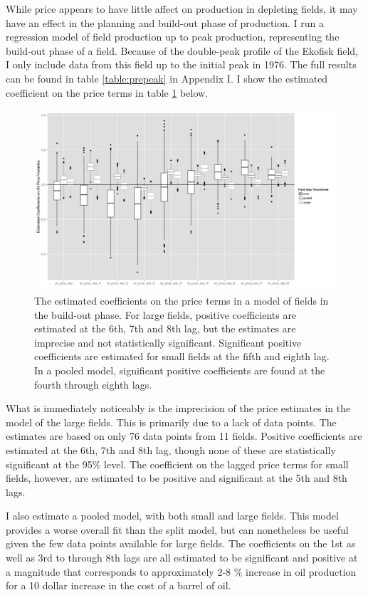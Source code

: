 \documentclass[12pt]{article}
\begin{document}
While price appears to have little affect on production in depleting fields, it may have an effect in the planning and build-out phase of production. I run a regression model of field production up to peak production, representing the build-out phase of a field.  Because of the double-peak profile of the Ekofisk field, I only include data from this field up to the initial peak in 1976.  The full results can be found in table \ref{table:prepeak} in Appendix I.  I show the estimated coefficient on the price terms in table \ref{gam_prepeak_print} below.  

\begin{figure}
	\includegraphics[width=1\textwidth]{figures/gam_prepeak_print.png}
	\caption{The estimated coefficients on the price terms in a model of fields in the build-out phase.  For large fields, positive coefficients are estimated at the 6th, 7th and 8th lag, but the estimates are imprecise and not statistically significant.  Significant positive coefficients are estimated for small fields at the fifth and eighth lag.  In a pooled model, significant positive coefficients are found at the fourth through eighth lags.}
	\label{gam_prepeak_print}
\end{figure}

What is immediately noticeably is the imprecision of the price estimates in the model of the large fields.  This is primarily due to a lack of data points.  The estimates are based on only 76 data points from 11 fields.  Positive coefficients are estimated at the 6th, 7th and 8th lag, though none of these are statistically significant at the 95\% level.  The coefficient on the lagged price terms for small fields, however, are estimated to be positive and significant at the 5th and 8th lags.  

I also estimate a pooled model, with both small and large fields.  This model provides a worse overall fit than the split model, but can nonetheless be useful given the few data points available for large fields.  The coefficients on the 1st as well as 3rd to through 8th lags are all estimated to be significant and positive at a magnitude that corresponds to approximately 2-8 \% increase in oil production for a 10 dollar increase in the cost of a barrel of oil.
\end{document}
